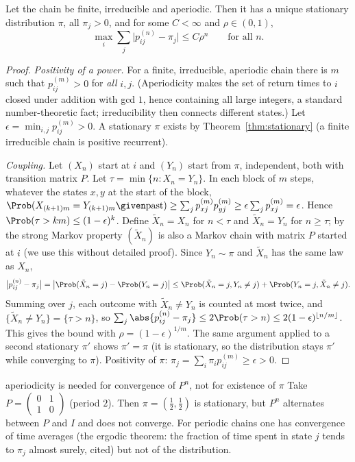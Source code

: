 \begin{theorem}\label{thm:convergence}
Let the chain be finite, irreducible and aperiodic. Then it has a unique stationary
distribution $\pi$, all $\pi_j>0$, and for some $C<\infty$ and $\rho\in(0,1)$,
\[
\max_{i}\sum_j\bigl\lvert p^{(n)}_{ij}-\pi_j\bigr\rvert\le C\rho^n\qquad\text{for all }n.
\]
\end{theorem}
\begin{proof}
\emph{Positivity of a power.} For a finite, irreducible, aperiodic chain there is $m$ such
that $p^{(m)}_{ij}>0$ for \emph{all} $i,j$. (Aperiodicity makes the set of return times
to $i$ closed under addition with gcd $1$, hence containing all large integers, a
standard number-theoretic fact; irreducibility then connects different states.) Let
$\epsilon=\min_{i,j}p^{(m)}_{ij}>0$. A stationary $\pi$ exists by Theorem~\ref{thm:stationary}
(a finite irreducible chain is positive recurrent).

\emph{Coupling.} Let $(X_n)$ start at $i$ and $(Y_n)$ start from $\pi$, independent, both
with transition matrix $P$. Let $\tau=\min\{n:X_n=Y_n\}$. In each block of $m$ steps, whatever
the states $x,y$ at the start of the block, $\Prob(X_{(k+1)m}=Y_{(k+1)m}\given\text{past})
\ge\sum_jp^{(m)}_{xj}p^{(m)}_{yj}\ge\epsilon\sum_jp^{(m)}_{xj}=\epsilon$. Hence
$\Prob(\tau>km)\le(1-\epsilon)^k$. Define $\tilde X_n=X_n$ for $n<\tau$ and $\tilde X_n=Y_n$
for $n\ge\tau$; by the strong Markov property $(\tilde X_n)$ is also a Markov chain with
matrix $P$ started at $i$ (we use this without detailed proof). Since $Y_n\sim\pi$ and $\tilde X_n$ has the same law as $X_n$,
\[
\bigl\lvert p^{(n)}_{ij}-\pi_j\bigr\rvert=\bigl\lvert\Prob(\tilde X_n=j)-\Prob(Y_n=j)\bigr\rvert
\le\Prob(\tilde X_n=j,Y_n\ne j)+\Prob(Y_n=j,\tilde X_n\ne j).
\]
Summing over $j$, each outcome with $\tilde X_n\ne Y_n$ is counted at most twice, and
$\{\tilde X_n\ne Y_n\}=\{\tau>n\}$, so
$\sum_j\abs{p^{(n)}_{ij}-\pi_j}\le2\Prob(\tau>n)\le2(1-\epsilon)^{\lfloor n/m\rfloor}$. This gives the bound with
$\rho=(1-\epsilon)^{1/m}$. The same argument applied to a second stationary $\pi'$ shows
$\pi'=\pi$ (it is stationary, so the distribution stays $\pi'$ while converging to $\pi$).
Positivity of $\pi$: $\pi_j=\sum_i\pi_ip^{(m)}_{ij}\ge\epsilon>0$.
\end{proof}

\begin{nuance}{aperiodicity is needed for convergence of $P^n$, not for existence of $\pi$}
Take $P=\begin{pmatrix}0&1\\1&0\end{pmatrix}$ (period $2$). Then $\pi=(\frac12,\frac12)$ is
stationary, but $P^n$ alternates between $P$ and $I$ and does not converge. For periodic
chains one has convergence of time averages (the ergodic theorem: the fraction of time spent
in state $j$ tends to $\pi_j$ almost surely, cited) but not of the distribution.
\end{nuance}

